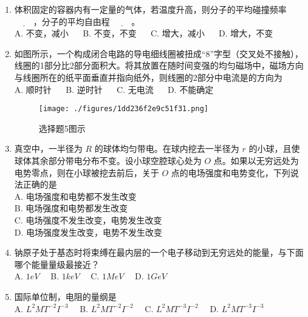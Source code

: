 \begin{enumerate}
\item 体积固定的容器内有一定量的气体，若温度升高，则分子的平均碰撞频率 $\underline{~~~~~~~~~~}$，分子的平均自由程 $\underline{~~~~~~~~~~}$。\\
A. 不变，减小 $\quad$
B. 不变，不变 $\quad$
C. 增大，减小 $\quad$
D. 增大，不变 $\quad$

\item 如图所示，一个构成闭合电路的导电细线圈被扭成“8”字型（交叉处不接触），线圈的1部分比2部分面积大。将其放置在随时间变强的均匀磁场中，磁场方向与线圈所在的纸平面垂直并指向纸外，则线圈的2部分中电流是的方向为\\
A. 顺时针 $\quad$
B. 逆时针 $\quad$
C. 无电流 $\quad$
D. 不能确定 $\quad$
\begin{figure}[ht]
\centering
\texttt{[image: ./figures/1dd236f2e9c51f31.png]}
\caption{选择题5图示} \label{fig_CAS17_2}
\end{figure}
\item 真空中，一半径为 $R$ 的球体均匀带电。在球内挖去一半径为 $r$ 的小球，且使球体其余部分带电分布不变。设小球空腔球心处为 $O$ 点。如果以无穷远处为电势零点，则在小球被挖去前后，关于 $O$ 点的电场强度和电势变化，下列说法正确的是\\
A. 电场强度和电势都不发生改变 \\
B. 电场强度和电势都发生改变 \\
C. 电场强度不发生改变，电势发生改变 \\
D. 电场强度发生改变，电势不发生改变 \\
\item 钠原子处于基态时将束缚在最内层的一个电子移动到无穷远处的能量，与下面哪个能量量级最接近？\\
A. $1eV\quad$
B. $1keV\quad$
C. $1MeV\quad$
D. $1GeV\quad$
\item 国际单位制，电阻的量纲是\\
A. $L^{2}MT^{-2}I^{-3}\quad$
B. $L^{2}MT^{-2}I^{-2}\quad$
C. $L^{2}MT^{-3}I^{-2}\quad$
D. $L^{2}MT^{-3}I^{-3}\quad$
\end{enumerate}
